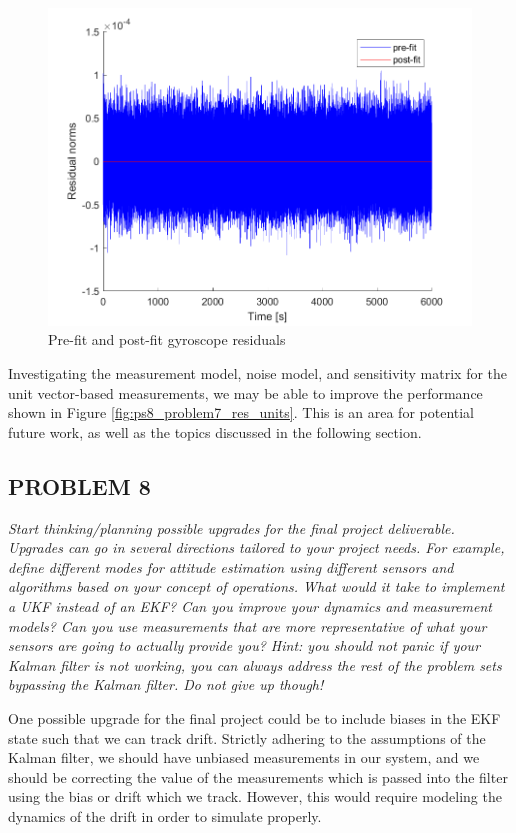 \begin{figure}[H]
\centering
\includegraphics[scale=0.8]{Images/ps8_problem7_res_gyro.png}
\caption{Pre-fit and post-fit gyroscope residuals}
\label{fig:ps8_problem7_res_gyro}
\end{figure}

Investigating the measurement model, noise model, and sensitivity matrix for the unit vector-based measurements, we may be able to improve the performance shown in Figure \ref{fig:ps8_problem7_res_units}. This is an area for potential future work, as well as the topics discussed in the following section.

\subsection{PROBLEM 8}
\textit{Start thinking/planning possible upgrades for the final project deliverable. Upgrades can go in several directions tailored to your project needs. For example, define different modes for attitude estimation using different sensors and algorithms based on your concept of operations. What would it take to implement a UKF instead of an EKF? Can you improve your dynamics and measurement models? Can you use measurements that are more representative of what your sensors are going to actually provide you? Hint: you should not panic if your Kalman filter is not working, you can always address the rest of the problem sets bypassing the Kalman filter. Do not give up though!}

One possible upgrade for the final project could be to include biases in the EKF state such that we can track drift. Strictly adhering to the assumptions of the Kalman filter, we should have unbiased measurements in our system, and we should be correcting the value of the measurements which is passed into the filter using the bias or drift which we track. However, this would require modeling the dynamics of the drift in order to simulate properly.

